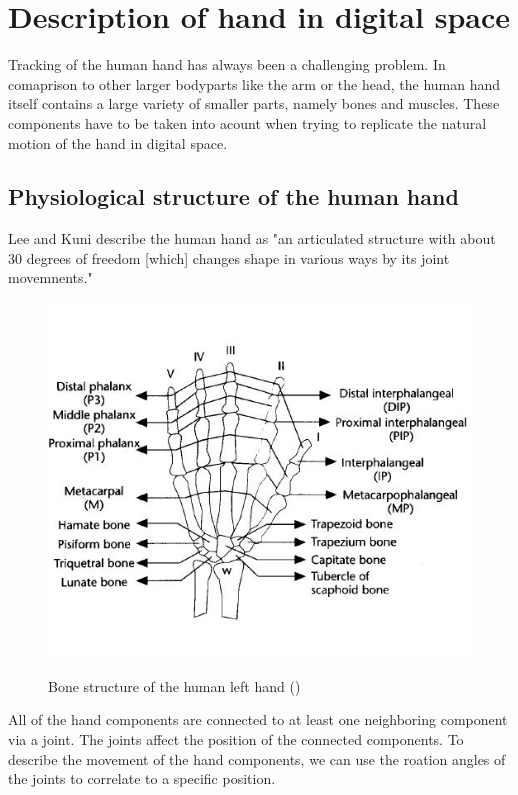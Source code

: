 
\chapter{Description of hand in digital space}
Tracking of the human hand has always been a challenging problem. In comaprison to other larger bodyparts like the arm or the head, the human hand itself contains a large variety of smaller parts, namely bones and muscles. These components have to be taken into acount when trying to replicate the natural motion of the hand in digital space.\\
\section{Physiological structure of the human hand}
\label{p}
Lee and Kuni \citep{LEE.1995} describe the human hand as "an articulated structure with about 30 degrees of freedom [which] changes shape in various ways by its joint movemnents."
\begin{figure}[H]
	\includegraphics[scale=0.8]{images/hand.jpg}
	\label{Handstructure} 
	\caption{Bone structure of the human left hand (\cite{LEE.1995})}
\end{figure}
All of the hand components are connected to at least one neighboring component via a joint. The joints affect the position of the connected components. To describe the movement of the hand components, we can use the roation angles of the joints to correlate to a specific position.\\
